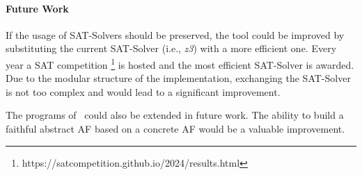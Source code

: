 \paragraph{Future Work} If the usage of SAT-Solvers should be preserved, the tool could be improved by substituting the current SAT-Solver (i.e., \emph{z3}) with a more efficient one. Every year a SAT competition \footnote{https://satcompetition.github.io/2024/results.html} is hosted and the most efficient SAT-Solver is awarded. Due to the modular structure of the implementation, exchanging the SAT-Solver is not too complex and would lead to a significant improvement.

The programs of \prog\ could also be extended in future work. The ability to build a faithful abstract AF based on a concrete AF would be a valuable improvement.

